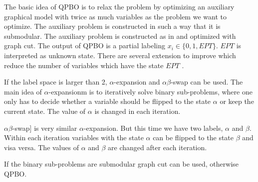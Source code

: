 The basic idea of QPBO is to relax the problem by optimizing an auxiliary graphical
model with twice as much variables as the problem we want to optimize. The
auxiliary problem is constructed in such a way that it is submodular. The
auxiliary problem is constructed as in \cite{rother_2007_cvpr} and optimized with graph cut. 
The output of QPBO
is a partial labeling $x_i \in \{ 0,1, EPT \}$. $EPT$ is interpreted as unknown state. There are several
extension to improve which reduce the number
of variables which have the state $EPT$ .


If the label space is larger than 2, $\alpha$-expansion and $\alpha \beta$-swap \cite{boykov_2001_pami} can be used.
The main idea of $\alpha$-expansionm is to iteratively
solve binary sub-problems, where one only has to decide whether a variable should be
flipped to the state $\alpha$ or keep the current state. The value of $\alpha$ is changed in each iteration.

$\alpha \beta$-swap] is very similar  $\alpha$-expansion.
But this time we have two labels, $\alpha$ and $\beta$. Within each iteration variables
with the state $\alpha$ can be flipped to the state $\beta$ and visa versa. The values of $\alpha$ and $\beta$
are changed after each iteration.

If the binary sub-problems are submodular graph cut can be used, otherwise QPBO.





